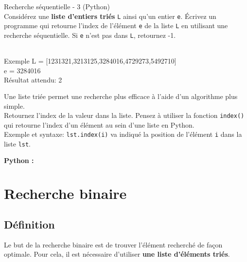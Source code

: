 \begin{Exercice}[5 minutes] Recherche séquentielle - 3 (Python)\\

    Considérez une \textbf{liste d’entiers triés} \lstinline{L} ainsi qu’un entier \lstinline{e}. Écrivez un programme qui retourne l'index de l'élément \lstinline{e} de la liste \lstinline{L} en utilisant une recherche séquentielle. Si \lstinline{e} n’est pas dans \lstinline{L}, retournez -1.\\\\
    
    \begin{Example}{\faTerminal Exemple}
    L = [1231321,3213125,3284016,4729273,5492710]\\
    e = 3284016\\
    Résultat attendu: 2\\
    \end{Example}
  


    \begin{conseil}
        Une liste triée permet une recherche plus efficace à l'aide d'un algorithme plus simple.\\
        Retournez l'index de la valeur dans la liste. Pensez à utiliser la fonction \lstinline{index()} qui retourne l'index d'un élément au sein d'une liste en Python.\\Exemple et syntaxe: \lstinline{lst.index(i)} va indiqué la position de l'élément \lstinline{i} dans la liste \lstinline{lst}.
    \end{conseil}


    \begin{solution}
        \textbf{Python :}
        
    \end{solution}
\end{Exercice}

\newpage
\section{Recherche binaire}

\subsection{Définition}

Le but de la recherche binaire est de trouver l'élément recherché de façon optimale. Pour cela, il est nécessaire d'utiliser \textbf{une liste d'éléments triés}.\\

